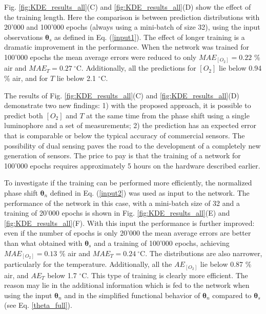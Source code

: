 \documentclass[sensors,article,submit,moreauthors,pdftex,10pt,a4paper]{Definitions/mdpi}
\begin{document}
Fig. \ref{fig:KDE_results_all}(C) and \ref{fig:KDE_results_all}(D) show the effect of the training length. Here the comparison is between prediction distributions with 20'000 and 100'000 epochs (always using a mini-batch of size 32), using the input observations ${\pmb \theta}_s$ as defined in Eq. (\ref{input1}). The effect of longer training is a dramatic improvement in the performance. When the network was trained for 100'000 epochs the mean average errors were reduced to only $MAE_{[O_2]}=0.22$ \% air and $MAE_{T}=0.27  \ ^\circ$C. Additionally, all the predictions for $[O_2]$ lie below 0.94 \% air, and for $T$ lie below 2.1 $^\circ$C.

The results of Fig. \ref{fig:KDE_results_all}(C) and \ref{fig:KDE_results_all}(D) demonstrate two new findings: 1) with the proposed approach, it is possible to predict both $[O_2]$ and $T$ at the same time from the phase shift using a single luminophore and a set of measurements; 2) the prediction has an expected error that is comparable or below the typical accuracy of commercial sensors. The possibility of dual sensing paves the road to the development of a completely new generation of sensors.
The price to pay is that the training of a network for 100'000 epochs requires approximately 5 hours on the hardware described earlier.

To investigate if the training can be performed more efficiently, the normalized phase shift ${\pmb \theta}_n$ defined in Eq. (\ref{input2}) was used as input to the network. The performance of the network in this case, with a mini-batch size of 32 and a training of 20'000 epochs is shown in Fig. \ref{fig:KDE_results_all}(E) and \ref{fig:KDE_results_all}(F). With this input the performance is further improved: even if the number of epochs is only 20'000 the mean average errors are better than what obtained with ${\pmb \theta}_s$ and a training of 100'000 epochs, achieving $MAE_{[O_2]}=0.13$ \% air and $MAE_{T}=0.24 \ ^\circ$C. The distributions are also narrower, particularly for the temperature. Additionally, all the $AE_{[O_2]}$ lie below 0.87 \% air, and  $AE_{T}$ below 1.7 $^\circ$C. This type of training is clearly more efficient. The reason may lie in the additional information which is fed to the network when using the input ${\pmb \theta}_n$ and in the simplified functional behavior of ${\pmb \theta}_n$ compared to ${\pmb \theta}_s$ (see Eq. \ref{theta_full}).
\end{document}
